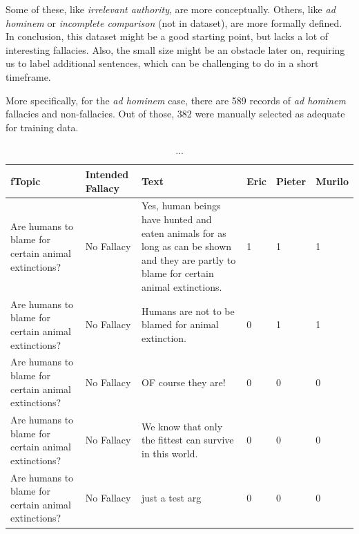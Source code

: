 \documentclass[a4paper]{article}
\begin{document}
Some of these, like \emph{irrelevant authority}, are more conceptually. Others, like \emph{ad hominem} or \emph{incomplete comparison} (not in dataset), are more formally defined. In conclusion, this dataset might be a good starting point, but lacks a lot of interesting fallacies. Also, the small size might be an obstacle later on, requiring us to label additional sentences, which can be challenging to do in a short timeframe. 

More specifically, for the \emph{ad hominem} case, there are 589 records of \emph{ad hominem} fallacies and non-fallacies. Out of those, 382 were manually selected as adequate for training data. 

\begin{table}
    \caption{...}\label{table:general-dataset}
    \begin{tabularx}{\textwidth}{@{}LlLlll@{}}
    \hline
    fTopic                                  & Intended Fallacy & Text                                                                                                                        & Eric & Pieter & Murilo \\ \hline
    Are humans to blame for certain animal extinctions? & No Fallacy                    & Yes, human beings have hunted and eaten animals for as long as can be shown and they are partly to blame for certain animal extinctions. & 1    & 1      & 1      \\
    Are humans to blame for certain animal extinctions? & No Fallacy                    & Humans are not to be blamed for animal extinction.                                                                                       & 0    & 1      & 1      \\
    Are humans to blame for certain animal extinctions? & No Fallacy                    & OF course they are!                                                                                                                      & 0    & 0      & 0      \\
    Are humans to blame for certain animal extinctions? & No Fallacy                    & We know that only the fittest can survive in this world.                                                                                 & 0    & 0      & 0      \\
    Are humans to blame for certain animal extinctions? & No Fallacy                    & just a test arg                                                                                                                          & 0    & 0      & 0      \\

\end{tabularx}
\end{table}
\end{document}

